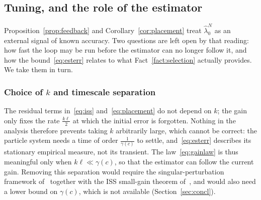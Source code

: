 \documentclass[letterpaper, 10pt, conference]{ieeeconf}
\newtheorem{remark}{\it \textbf{Remark}}
\newcommand{\rev}[1]{#1}
\newcommand{\pl}[1]{#1}
\newcommand{\ed}[1]{#1}
\begin{document}
\subsection{\rev{Tuning, and the role of the estimator}}
\label{sec:tuning}
\rev{Proposition~\ref{prop:feedback} and Corollary~\ref{cor:placement} treat
$\widehat\lambda_0^N$ as an external signal of known accuracy. Two questions are
left open by that reading: how fast the loop may be run before the estimator
can no longer follow it, and how the bound~\eqref{eq:esterr} relates to what
Fact~\ref{fact:selection} actually provides. We take them in turn.}

\subsubsection*{Choice of $k$ and timescale separation}
\rev{The residual terms in~\eqref{eq:iss} and~\eqref{eq:placement} do not
depend on $k$; the gain only fixes the rate $\frac{k\ell}{2}$ at which the
initial error is forgotten. Nothing in the analysis therefore prevents taking
$k$ arbitrarily large, \pl{which cannot be correct}: the particle system needs a time
of order $\frac{1}{\gamma(c)}$ to settle, and~\eqref{eq:esterr} describes its
stationary empirical measure, not its transient. The law~\eqref{eq:gainlaw} is
thus meaningful only when $k\ell\ll\gamma(c)$, so that the estimator can follow
the current gain. Removing this separation would require the
singular-perturbation framework of~\cite{kokotovic} together with the ISS
small-gain theorem of~\cite{jiangteel}, and would also need a lower bound on
$\gamma(c)$, which is not available (Section~\ed{\ref{sec:concl}}).}
\end{document}
